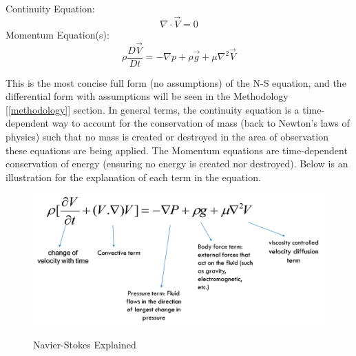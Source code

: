 \documentclass{article}
\begin{document}
\begin{boxA}
	Continuity Equation:
	\begin{equation}
		\nabla \cdot \vec{V} = 0
	\end{equation}
	Momentum Equation(s):
	\begin{equation}
		\rho \frac{D \vec{V}}{Dt} = -\nabla p + \rho \vec{g} + \mu
		\nabla^2 \vec{V}
	\end{equation}

\end{boxA}


This is the most concise full form (no assumptions) of the N-S equation,
and the differential form with assumptions will be seen in the Methodology
	[\ref{methodology}] section. In general terms, the continuity equation
is a
time-dependent way to account for the conservation of mass (back to Newton's
laws of physics) such that no mass is created or destroyed in the area of
observation these equations are being applied. The Momentum equations are
time-dependent conservation of energy (ensuring no energy is created nor
destroyed). Below is an  illustration for the explanation of each term in the
equation.

\begin{figure}[htb]
	\centering
	\includegraphics[scale=0.25]{./images/f.png}\label{fig:ns_ref}
	\caption{Navier-Stokes Explained\cite{sim_world_2014} }
\end{figure}
\end{document}
